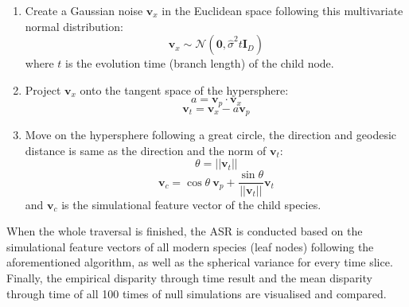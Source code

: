 

\begin{enumerate}
    \item Create a Gaussian noise $\mathbf{v}_{x}$ in the Euclidean space following this multivariate normal distribution:
    \begin{equation}
        \mathbf{v}_{x} \sim \mathcal{N}(\mathbf{0}, \hat{\sigma}^2 t \mathbf{I}_D)
    \end{equation}
    where $t$ is the evolution time (branch length) of the child node.
    \item Project $\mathbf{v}_{x}$ onto the tangent space of the hypersphere:
    \begin{equation}
        a = \mathbf{v}_{p} \cdot \mathbf{v}_{x}
    \end{equation}
    \begin{equation}
        \mathbf{v}_{t} = \mathbf{v}_{x} - a \mathbf{v}_{p}
    \end{equation}
    \item Move on the hypersphere following a great circle, the direction and geodesic distance is same as the direction and the norm of $\mathbf{v}_{t}$:
    \begin{equation}
        \theta = ||\mathbf{v}_{t}||
    \end{equation}
    \begin{equation}
        \mathbf{v}_{c} = \cos{\theta}~\mathbf{v}_{p} + \frac{\sin{\theta}}{||\mathbf{v}_{t}||} \mathbf{v}_{t}
    \end{equation}
    and $\mathbf{v}_{c}$ is the simulational feature vector of the child species.
\end{enumerate}

When the whole traversal is finished, the ASR is conducted based on the simulational
feature vectors of all modern species (leaf nodes) following the aforementioned algorithm,
as well as the spherical variance for every time slice. Finally, the empirical disparity
through time result and the mean disparity through time of all 100 times of null simulations
are visualised and compared. 